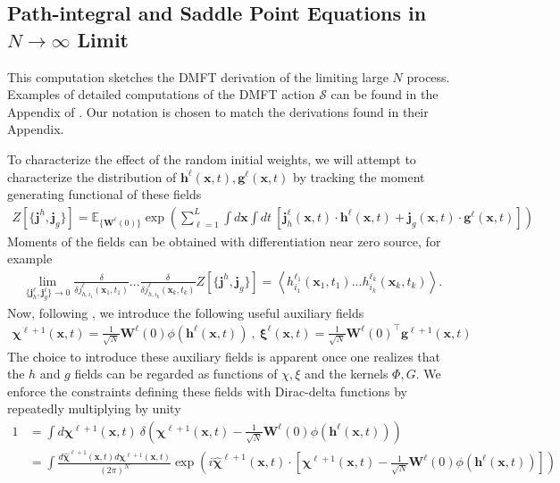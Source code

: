 \documentclass{article} %
\def\h{\bm h}
\def\x{\bm x}
\def\g{\bm g}
\def\W{\bm W}
\begin{document}
\subsection{Path-integral and Saddle Point Equations in $N \to \infty$ Limit}

This computation sketches the DMFT derivation of the limiting large $N$ process. Examples of detailed computations of the DMFT action $\mathcal S$ can be found in the Appendix of \cite{bordelon2022self, bordelon2022influence}. Our notation is chosen to match the derivations found in their Appendix. 

To characterize the effect of the random initial weights, we will attempt to characterize the distribution of $\h^\ell(\x,t), \g^\ell(\x,t)$ by tracking the moment generating functional of these fields 
\begin{align}
    Z[\{ \bm j^h, \bm j_g \}] = \mathbb{E}_{\{\W^\ell(0) \}} \exp\left( \sum_{\ell=1}^L \int d\x \int dt \  [ \bm j_h^\ell(\x,t) \cdot \h^\ell(\x,t) + \bm j_g(\x,t) \cdot \g^\ell(\x,t) ] \right)
\end{align}
Moments of the fields can be obtained with differentiation near zero source, for example
\begin{align}
    \lim_{\{\bm j_h^\ell,\bm j_g^\ell\} \to 0} \frac{\delta}{\delta j^\ell_{h, i_1}(\x_1,t_1) } ... \frac{\delta}{\delta j^\ell_{h, i_k}(\x_k,t_k) } Z[\{ \bm j^h, \bm j_g \}] = \left< h_{i_1}^{\ell_1}(\x_1,t_1) ... h_{i_k}^{\ell_k}(\x_k,t_k) \right> .
\end{align}
Now, following \cite{bordelon2022self}, we introduce the following useful auxiliary fields
\begin{align}
    \bm\chi^{\ell+1}(\x,t) = \frac{1}{\sqrt N} \W^{\ell}(0) \phi(\h^\ell(\x,t)) \ , \  \bm\xi^{\ell}(\x,t) = \frac{1}{\sqrt N} \W^{\ell}(0)^\top \g^{\ell+1}(\x,t)
\end{align}
The choice to introduce these auxiliary fields is apparent once one realizes that the $h$ and $g$ fields can be regarded as functions of $\chi, \xi$ and the kernels $\Phi, G$. We enforce the constraints defining these fields with Dirac-delta functions by repeatedly multiplying by unity
\begin{align}
    1 &= \int d \bm\chi^{\ell+1}(\x,t) \  \delta\left( \bm\chi^{\ell+1}(\x,t) - \frac{1}{\sqrt N} \W^\ell(0) \phi(\h^\ell(\x,t))  \right) \nonumber
    \\
    &= \int \frac{  d \hat{\bm\chi}^{\ell+1}(\x,t) d\bm\chi^{\ell+1}(\x,t) }{(2\pi)^N} \exp\left( i \hat{\bm\chi}^{\ell+1}(\x,t) \cdot \left[\bm\chi^{\ell+1}(\x,t) - \frac{1}{\sqrt N} \W^\ell(0) \phi(\h^\ell(\x,t))  \right]\right)
\end{align}
\end{document}

